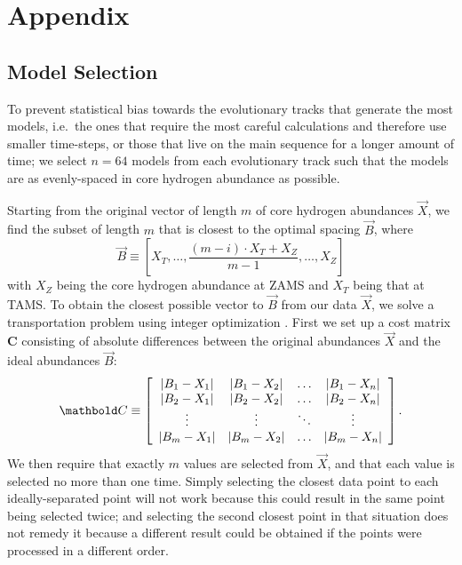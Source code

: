 \section{Appendix}
\subsection{Model Selection}
\label{sec:selection}
To prevent statistical bias towards the evolutionary tracks that generate the most models, i.e.\ the ones that require the most careful calculations and therefore use smaller time-steps, or those that live on the main sequence for a longer amount of time; we select ${n=64}$ models from each evolutionary track such that the models are as evenly-spaced in core hydrogen abundance as possible. 

Starting from the original vector of length $m$ of core hydrogen abundances $\vec X$, we find the subset of length $m$ that is closest to the optimal spacing $\vec B$, where
\begin{equation}
  \vec B \equiv \left[
    X_T, 
    \ldots, 
    \frac{(m-i)\cdot X_T + X_Z}{m-1}, 
    \ldots, 
    X_Z
  \right]
\end{equation}
with $X_Z$ being the core hydrogen abundance at ZAMS and $X_T$ being that at TAMS. To obtain the closest possible vector to $\vec B$ from our data $\vec X$, we solve a transportation problem using integer optimization \citep{23145595}. First we set up a cost matrix $\boldsymbol{C}$ consisting of absolute differences between the original abundances $\vec X$ and the ideal abundances $\vec B$:
\begin{equation} 
  \boldsymbol{C} \equiv \left[
  \begin{array}{cccc}
    \abs{B_1-X_1} & \abs{B_1-X_2} & \dots & \abs{B_1-X_n} \\
    \abs{B_2-X_1} & \abs{B_2-X_2} & \dots & \abs{B_2-X_n} \\
    \vdots & \vdots & \ddots & \vdots \\
    \abs{B_m-X_1} & \abs{B_m-X_2} & \dots & \abs{B_m-X_n}
  \end{array} \right].
\end{equation}
We then require that exactly $m$ values are selected from $\vec X$, and that each value is selected no more than one time. Simply selecting the closest data point to each ideally-separated point will not work because this could result in the same point being selected twice; and selecting the second closest point in that situation does not remedy it because a different result could be obtained if the points were processed in a different order. 

